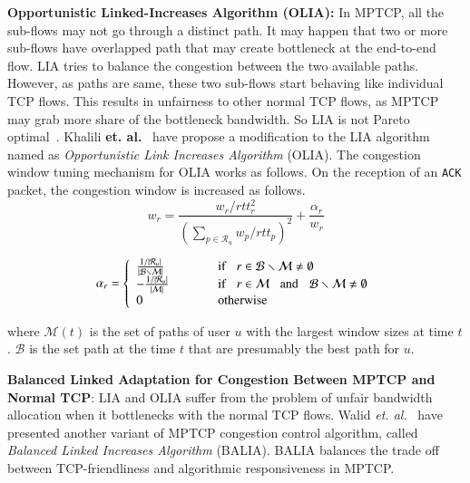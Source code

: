 \textbf{Opportunistic Linked-Increases Algorithm (OLIA):} In MPTCP, all the sub-flows may not go through a distinct path. It may happen that two or more sub-flows have overlapped path that may create bottleneck at the end-to-end flow. LIA tries to balance the congestion between the two available paths. However, as paths are same, these two sub-flows start behaving like individual TCP flows. This results in unfairness to other normal TCP flows, as MPTCP may grab more share of the bottleneck bandwidth. So LIA is not Pareto optimal~\cite{OLIARamin2012}. Khalili \textbf{et. al.}~\cite{OLIARamin2012} have propose a modification to the LIA algorithm named as \textit{Opportunistic Link Increases Algorithm} (OLIA). The congestion window tuning mechanism for OLIA works as follows.  On the reception of an \texttt{ACK} packet, the congestion window is increased as follows. 
\begin{equation}
w_r = \frac{w_r/rtt_r^2}{\left( \sum_{p \in \mathcal{R}_u}w_p/rtt_p\right)^2} + \frac{\alpha_r}{w_r}
\end{equation}


\begin{equation}
\alpha_r = \left\lbrace 
\begin{array}{ll}
\frac{1/|\mathcal{R}_u|}{|\mathcal{B}\smallsetminus \mathcal{M}|}  &\mbox{if} \hspace{0.3cm} r \in \mathcal{B}\smallsetminus\mathcal{M}\neq\emptyset   \\
- \frac{1/|\mathcal{R}_u|}{|\mathcal{M}|} \hspace{1cm}&\mbox{if} \hspace{0.3cm} r \in \mathcal{M} \hspace{0.3cm}\mbox{and}\hspace{0.3cm}\mathcal{B}\smallsetminus\mathcal{M}\neq \emptyset \\
0 & \mbox{otherwise}
\end{array} \right. 
\end{equation}

where $\mathcal{M}(t)$ is the set of paths of user $u$ with the largest window sizes at time $t$.  $\mathcal{B}$ is the set path at the time $t$ that are presumably the best path for $u$.

\textbf{Balanced Linked Adaptation for Congestion Between MPTCP and Normal TCP}:
LIA and OLIA  suffer from the problem of unfair bandwidth allocation when it bottlenecks with the normal TCP flows. Walid \textit{et. al.}~\cite{walid2015balanced} have presented another variant of MPTCP congestion control algorithm, called {\em Balanced Linked Increases Algorithm} (BALIA). BALIA balances the trade off between TCP-friendliness and algorithmic responsiveness in MPTCP.

